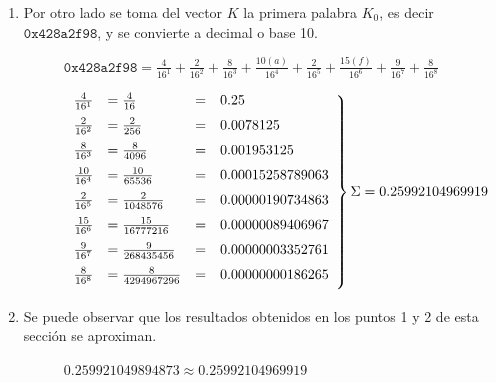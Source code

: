 \documentclass{article}
\begin{document}
\begin{enumerate}
            \item Por otro lado se toma del vector $K$ la primera palabra $K_{0}$, es decir $\texttt{0x428a2f98}$, y se convierte a decimal o base 10.
                \begin{figure}[H]
                \centering
                    $\texttt{0x428a2f98} = \frac{4}{16^{1}} + \frac{2}{16^{2}} + \frac{8}{16^{3}} + \frac{10(a)}{16^{4}} + \frac{2}{16^{5}} + \frac{15(f)}{16^{6}} + \frac{9}{16^{7}} + \frac{8}{16^{8}}$
                \end{figure}
                \begin{figure}[H]
                \centering
                    $\left .
                    \begin{array}{llllr}
                    \vspace{2mm}
                    \frac{4}{16^{1}} & = \frac{4}{16} & = & 0.25 \\ \vspace{2mm}
                    \frac{2}{16^{2}} & = \frac{2}{256} & = & 0.0078125 \\ \vspace{2mm}
                    \frac{8}{16^{3}} & = \frac{8}{4096} & = & 0.001953125 \\ \vspace{2mm}
                    \frac{10}{16^{4}} & = \frac{10}{65536} & = & 0.00015258789063 \\ \vspace{2mm}
                    \frac{2}{16^{5}} & = \frac{2}{1048576} & = & 0.00000190734863 \\ \vspace{2mm}
                    \frac{15}{16^{6}} & = \frac{15}{16777216} & = & 0.00000089406967 \\ \vspace{2mm}
                    \frac{9}{16^{7}} & = \frac{9}{268435456} & = & 0.00000003352761 \\ \vspace{2mm}
                    \frac{8}{16^{8}} & = \frac{8}{4294967296} & = & 0.00000000186265
                    \end{array}
                    \right \} \Sigma = 0.25992104969919$
                \end{figure}
            
            \item Se puede observar que los resultados obtenidos en los puntos 1 y 2 de esta sección se aproximan.
                \begin{figure}[H]
                \centering
                    $0.259921049894873 \approx 0.25992104969919$
                \end{figure}
            

\end{enumerate}
\end{document}
